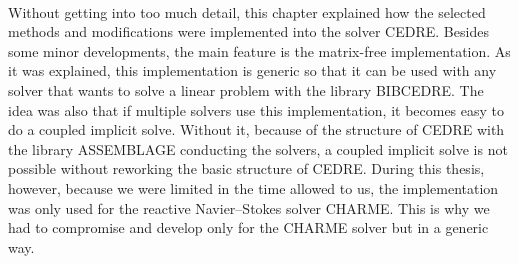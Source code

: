   \paragraph{}
  Without getting into too much detail, this chapter explained how the selected methods and modifications were implemented into the solver CEDRE.
  Besides some minor developments, the main feature is the matrix-free implementation.
  As it was explained, this implementation is generic so that it can be used with any solver that wants to solve a linear problem with the library BIBCEDRE.
  The idea was also that if multiple solvers use this implementation, it becomes easy to do a coupled implicit solve.
  Without it, because of the structure of CEDRE with the library ASSEMBLAGE conducting the solvers, a coupled implicit solve is not possible without reworking the basic structure of CEDRE.
  During this thesis, however, because we were limited in the time allowed to us, the implementation was only used for the reactive Navier--Stokes solver CHARME.
  This is why we had to compromise and develop only for the CHARME solver but in a generic way.
